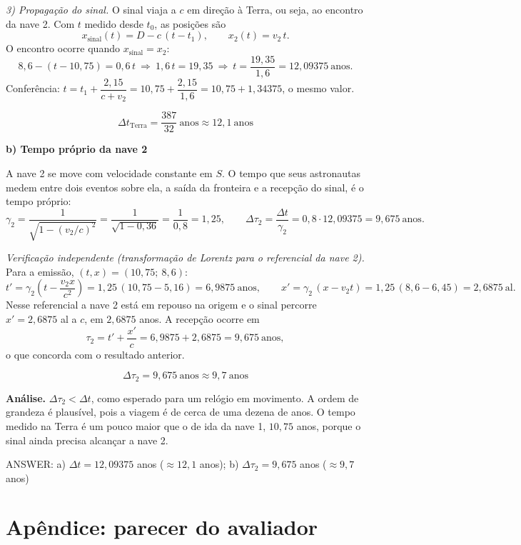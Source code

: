 \documentclass{article}%
\begin{document}
\emph{3) Propagação do sinal.} O sinal viaja a $c$ em direção à Terra, ou seja, ao encontro da nave 2. Com $t$ medido desde $t_0$, as posições são
\[
x_{\text{sinal}}(t)=D-c\,(t-t_1),\qquad x_2(t)=v_2\,t .
\]
O encontro ocorre quando $x_{\text{sinal}}=x_2$:
\[
8{,}6-(t-10{,}75)=0{,}6\,t\ \Rightarrow\ 1{,}6\,t=19{,}35
\ \Rightarrow\ t=\frac{19{,}35}{1{,}6}=12{,}09375\ \text{anos}.
\]
Conferência: $t=t_1+\dfrac{2{,}15}{c+v_2}=10{,}75+\dfrac{2{,}15}{1{,}6}=10{,}75+1{,}34375$, o mesmo valor.

\[
\boxed{\Delta t_{\text{Terra}}=\frac{387}{32}\ \text{anos}\approx 12{,}1\ \text{anos}}
\]

\textbf{b) Tempo próprio da nave 2}

A nave 2 se move com velocidade constante em $S$. O tempo que seus astronautas medem entre dois eventos sobre ela, a saída da fronteira e a recepção do sinal, é o tempo próprio:
\[
\gamma_2=\frac{1}{\sqrt{1-(v_2/c)^2}}=\frac{1}{\sqrt{1-0{,}36}}=\frac{1}{0{,}8}=1{,}25 ,
\qquad
\Delta\tau_2=\frac{\Delta t}{\gamma_2}=0{,}8\cdot 12{,}09375=9{,}675\ \text{anos}.
\]

\emph{Verificação independente (transformação de Lorentz para o referencial da nave 2).} Para a emissão, $(t,x)=(10{,}75;\ 8{,}6)$:
\[
t'=\gamma_2\!\left(t-\frac{v_2x}{c^2}\right)=1{,}25\,(10{,}75-5{,}16)=6{,}9875\ \text{anos},
\qquad
x'=\gamma_2\,(x-v_2t)=1{,}25\,(8{,}6-6{,}45)=2{,}6875\ \text{al}.
\]
Nesse referencial a nave 2 está em repouso na origem e o sinal percorre $x'=2{,}6875$ al a $c$, em $2{,}6875$ anos. A recepção ocorre em
\[
\tau_2=t'+\frac{x'}{c}=6{,}9875+2{,}6875=9{,}675\ \text{anos},
\]
o que concorda com o resultado anterior.

\[
\boxed{\Delta\tau_2=9{,}675\ \text{anos}\approx 9{,}7\ \text{anos}}
\]

\textbf{Análise.} $\Delta\tau_2<\Delta t$, como esperado para um relógio em movimento. A ordem de grandeza é plausível, pois a viagem é de cerca de uma dezena de anos. O tempo medido na Terra é um pouco maior que o de ida da nave 1, $10{,}75$ anos, porque o sinal ainda precisa alcançar a nave 2.

ANSWER: a) $\Delta t = 12{,}09375$ anos ($\approx 12{,}1$ anos); b) $\Delta\tau_2 = 9{,}675$ anos ($\approx 9{,}7$ anos)%
\newpage%
\section*{Apêndice: parecer do avaliador}%
\end{document}
